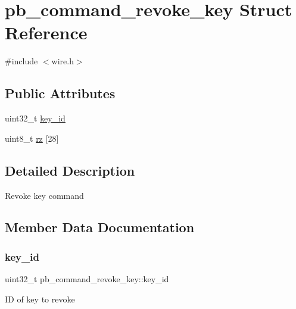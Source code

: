 \hypertarget{structpb__command__revoke__key}{}\section{pb\+\_\+command\+\_\+revoke\+\_\+key Struct Reference}
\label{structpb__command__revoke__key}


{\ttfamily \#include $<$wire.\+h$>$}

\subsection*{Public Attributes}
\begin{DoxyCompactItemize}
\item 
uint32\+\_\+t \hyperlink{structpb__command__revoke__key_a6b93dba46b3fa6fbd363d1105c09311c}{key\+\_\+id}
\item 
uint8\+\_\+t \hyperlink{structpb__command__revoke__key_a174e5625c57dedf14a3345e671c3f109}{rz} \mbox{[}28\mbox{]}
\end{DoxyCompactItemize}


\subsection{Detailed Description}
Revoke key command 

\subsection{Member Data Documentation}
\mbox{\label{structpb__command__revoke__key_a6b93dba46b3fa6fbd363d1105c09311c}} 
\subsubsection{\texorpdfstring{key\+\_\+id}{key\_id}}
{\footnotesize\ttfamily uint32\+\_\+t pb\+\_\+command\+\_\+revoke\+\_\+key\+::key\+\_\+id}

ID of key to revoke \mbox{\label{structpb__command__revoke__key_a174e5625c57dedf14a3345e671c3f109}} 
